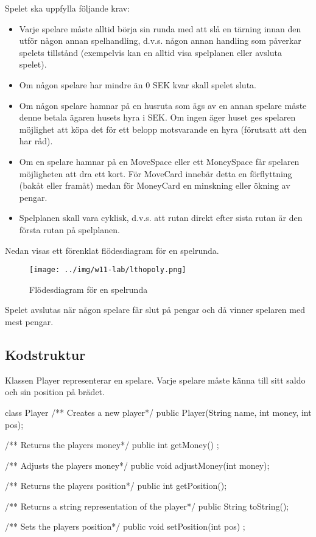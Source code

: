 Spelet ska uppfylla följande krav:
\begin{itemize}
\setlength\itemsep{2em}
\item Varje spelare måste alltid börja sin runda med att slå en tärning innan den utför någon annan spelhandling, d.v.s. någon annan handling som påverkar spelets tillstånd (exempelvis kan en alltid visa spelplanen eller avsluta spelet).
\item Om någon spelare har mindre än 0 SEK kvar skall spelet sluta.
\item Om någon spelare hamnar på en husruta som ägs av en annan spelare måste denne betala ägaren husets hyra i SEK. Om ingen äger huset ges spelaren möjlighet att köpa det för ett belopp motsvarande en hyra (förutsatt att den har råd).
\item Om en spelare hamnar på en MoveSpace eller ett MoneySpace får spelaren möjligheten att dra ett kort. För MoveCard innebär detta en förflyttning (bakåt eller framåt) medan för MoneyCard en minskning eller ökning av pengar.
\item Spelplanen skall vara cyklisk, d.v.s. att rutan direkt efter sista rutan är den första rutan på spelplanen.
\end{itemize}

Nedan visas ett förenklat flödesdiagram för en spelrunda.

\begin{figure}[H]
\centering
\texttt{[image: ../img/w11-lab/lthopoly.png]}
\caption { Flödesdiagram för en spelrunda}
\label{fig:scalajava:lthopoly-team:flowchart}
\end{figure}

Spelet avslutas när någon spelare får slut på pengar och då vinner spelaren med mest pengar.

\subsection{Kodstruktur}

Klassen Player representerar en spelare. Varje spelare måste känna till sitt saldo och sin position på brädet.

\begin{JavaSpec}{class Player}
	/** Creates a new player*/
	public Player(String name, int money, int pos);

	/** Returns the players money*/
	public int getMoney() ;

	/** Adjusts the players money*/
	public void adjustMoney(int money);

	/** Returns the players position*/
	public int getPosition();

	/** Returns a string representation of the player*/
	public String toString();

	/** Sets the players position*/
	public void setPosition(int pos) ;

\end{JavaSpec}

